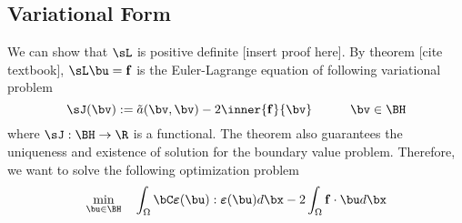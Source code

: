 \documentclass[11pt]{article}
\newcommand{\bepsilon}{\boldsymbol{\varepsilon}}
\renewcommand{\bf}{\mathbf{f}}
\newcommand{\ta}{\tilde{a}}
\begin{document}
\subsection*{Variational Form}
We can show that $\sL$ is positive definite [insert proof here]. By theorem [cite textbook], $\sL \bu = \bf$ is the Euler-Lagrange equation of following variational problem
\[
    \sJ(\bv) := \ta(\bv,\bv) - 2\inner{\bf}{\bv}
    \quad\quad\quad
    \bv\in\BH
\]
where $\sJ: \BH\to \R$ is a functional. The theorem also guarantees the uniqueness and existence of solution for the boundary value problem. Therefore, we want to solve the following optimization problem
\[
    \min_{\bu\in \BH} \quad
        \int_{\Omega} \bC \bepsilon(\bu) : \bepsilon(\bu) d\bx 
      - 2\int_{\Omega} \bf \cdot\bu d\bx
\]
\end{document}
